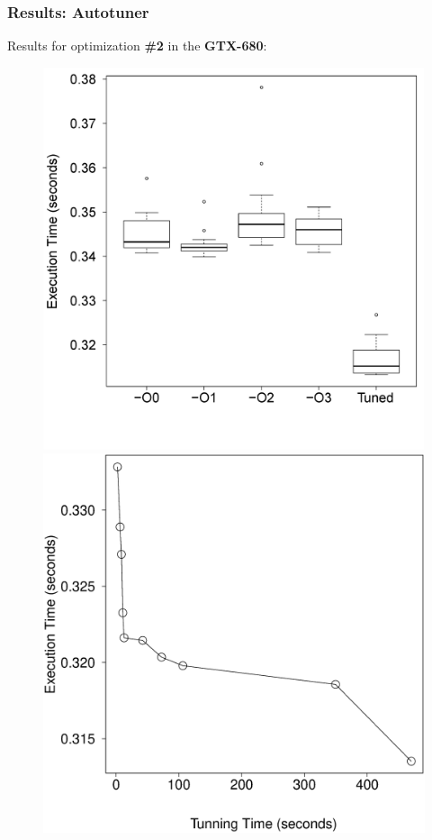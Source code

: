 \documentclass[10pt, compress]{beamer}
\begin{document}
\begin{frame}[fragile]
  \frametitle{Results: Autotuner}
  Results for optimization \alert{\bf \#2}
  in the \alert{\bf GTX-680}:

  \begin{figure}[htpb]
      \centering
      \begin{minipage}[t!]{.49\textwidth}
          \centering
          \includegraphics[width=\textwidth]{MatMulGPU-GTX-680-Box.eps}
      \end{minipage}%
      \hfill
      \begin{minipage}[t!]{.49\textwidth}
          \centering
          \includegraphics[width=\textwidth]{MatMulGPU-GTX-680-Best.eps}
      \end{minipage}%
  \end{figure}
\end{frame}
\end{document}
